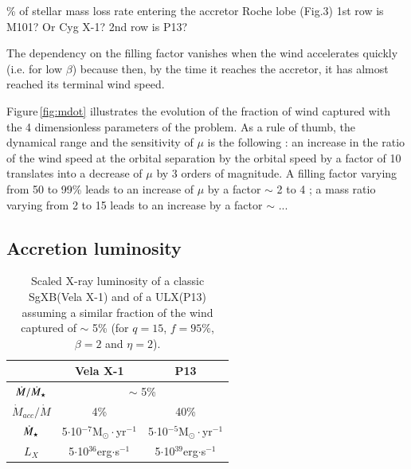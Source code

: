 \documentclass[letter]{aa}
\makeatletter
\newcommand{\sgx}{SgXB\xspace}
\newcommand{\ulx}{ULX\xspace}
\newcommand*{\ie}{i.e.\@\xspace}
\newcommand{\mystar}{{\fontfamily{lmr}\selectfont$\star$}}
\newcommand*{\mdotstar}{$\dot{M}_{\text{\mystar}}$\@\xspace}
\makeatother
\begin{document}
\% of stellar mass loss rate entering the accretor Roche lobe (Fig.3)
1st row is M101? Or Cyg X-1?
2nd row is P13?

The dependency on the filling factor vanishes when the wind accelerates quickly (\ie for low $\beta$) because then, by the time it reaches the accretor, it has almost reached its terminal wind speed.


Figure\,\ref{fig:mdot} illustrates the evolution of the fraction of wind captured with the 4 dimensionless parameters of the problem. As a rule of thumb, the dynamical range and the sensitivity of $\mu$ is the following : an increase in the ratio of the wind speed at the orbital separation by the orbital speed by a factor of 10 translates into a decrease of $\mu$ by 3 orders of magnitude. A filling factor varying from 50 to 99\% leads to an increase of $\mu$ by a factor $\sim$ 2 to 4 ; a mass ratio varying from 2 to 15 leads to an increase by a factor $\sim$ ...

\subsection{Accretion luminosity}
\label{sec:}

\begin{center}
\begin{table}[!h]
\caption{Scaled X-ray luminosity of a classic \sgx (Vela X-1) and of a \ulx (P13) assuming a similar fraction of the wind captured of $\sim$ 5\% (for $q=15$, $f=95\%$, $\beta=2$ and $\eta=2$).}
\label{tab:params}
\centering
\begin{tabularx}{0.83\columnwidth}{c|c|c}
   & Vela X-1 & P13 \\
  \hline
  $\dot{M}/\dot{M}_{\text{\mystar}}$ & \multicolumn{2}{c}{$\sim$ 5\%} \\
  \hline
  $\dot{M}_{acc}/\dot{M}$ & 4\%  & 40\% \\
  \mdotstar & 5$\cdot$10$^{-7}$M$_{\odot}\cdot$yr$^{-1}$ & 5$\cdot$10$^{-5}$M$_{\odot}\cdot$yr$^{-1}$ \\
  $L_X$ & 5$\cdot$10$^{36}$erg$\cdot$s$^{-1}$ & 5$\cdot$10$^{39}$erg$\cdot$s$^{-1}$ \\
\end{tabularx}
\end{table}
\end{center}
\end{document}
